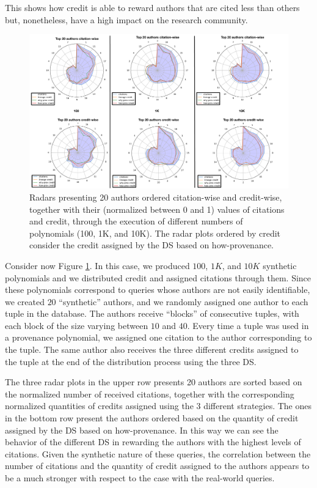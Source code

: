 This shows how credit is able to reward authors that are cited less than others but, nonetheless, have a high impact on the research community. 


\begin{figure}[t]
\centering
  \includegraphics[width=1\textwidth]{figures/3_radars}
  \caption{Radars presenting 20 authors ordered citation-wise and credit-wise, together with their (normalized between 0 and 1) values of citations and credit, through the execution of different numbers of polynomials (100, 1K, and 10K). The radar plots ordered by credit consider the credit assigned by the DS based on how-provenance.}
  \label{figure:3_radars}
\end{figure}

Consider now Figure \ref{figure:3_radars}.
In this case, we produced $100$, $1K$, and $10K$ synthetic polynomials and we distributed credit and assigned citations through them. Since these polynomials correspond to queries whose authors are not easily identifiable, we created $20$ ``synthetic'' authors, and we randomly assigned one author to each tuple in the database. The authors receive ``blocks'' of consecutive tuples, with each block of the size varying between $10$ and $40$. 
Every time a tuple was used in a provenance polynomial, we assigned one citation to the author corresponding to the tuple.  The same author also receives the three different credits assigned to the tuple at the end of the distribution process using the three DS.

The three radar plots in the upper row presents 20 authors are sorted based on the normalized number of received citations, together with the corresponding normalized quantities of credits assigned using the 3 different strategies.
The ones in the bottom row present the authors ordered based on the quantity of credit assigned by the DS based on how-provenance.
In this way we can see the behavior of the different DS in rewarding the authors with the highest levels of citations. 
Given the synthetic nature of these queries, the correlation between the number of citations and the quantity of credit assigned to the authors appears to be a much stronger with respect to the case with the real-world queries.

